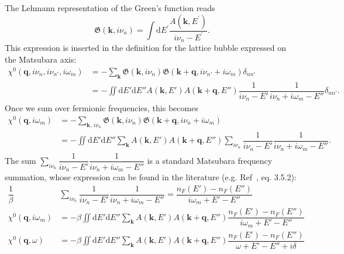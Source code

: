 \documentclass[preprint,prb,amsmath,superscriptaddress,showpacs]{revtex4}
\newcommand{\bk}{\mathbf{k}}
\newcommand{\bq}{\mathbf{q}}
\begin{document}
The Lehmann representation of the
Green's function reads
% 
\begin{equation}
  \mathfrak{G}(\mathbf{k}, i\nu_n) =
  \int \mathrm{d}E^{\prime}
  \frac{A(\mathbf{k}, E^{\prime})}{i\nu_n - E^{\prime}}.
\end{equation}
%
This expression is inserted in the definition for the lattice bubble
expressed on the Matsubara axis\cite{Boehnke2011, Kunes2011}:
%
\begin{equation}
  \begin{aligned}
      \chi^0(\bq, i\nu_n, i\nu_{n'}, i \omega_m) &=
      - \sum_{\bk}
      \mathfrak{G}(\bk, i\nu_n)
      \mathfrak{G}(\bk + \bq, i\nu_{n'} + i\omega_m) \delta_{n n'} \\
      &= - \iint
      \mathrm{d}E'
      \mathrm{d}E''
      A(\bk, E') 
      A(\bk + \bq, E'')
      \dfrac{1}{i\nu_n - E'}
      \dfrac{1}{i\nu_{n} + i \omega_m - E''}\delta_{n n'}.
    \end{aligned}
  \end{equation}
Once we sum over fermionic frequencies, this becomes 
%
\begin{equation}
  \begin{aligned}
    \chi^0(\bq, i \omega_m) &=
    - \sum_{\bk, \, i\nu_n}
    \mathfrak{G}(\bk, i\nu_n)
    \mathfrak{G}(\bk + \bq, i\nu_{n} + i\omega_m) \\
    &= - \iint
    \mathrm{d}E'
    \mathrm{d}E''
    \sum_{\bk} A(\bk, E') 
      A(\bk + \bq, E'')
      \sum_{i\nu_n}
    \dfrac{1}{i\nu_n - E'}
    \dfrac{1}{i\nu_{n} + i \omega_m - E''}.
    \end{aligned}
\end{equation}
%
The sum $\sum_{i\nu_n} \dfrac{1}{i\nu_n - E'} \dfrac{1}{i\nu_{n} + i
  \omega_m - E''}$ is a standard Matsubara frequency summation, whose
expression can be found in the literature (e.g. Ref~,
eq. 3.5.2):
\begin{equation}
  \begin{aligned}
    \label{eq:continuation}
    \dfrac{1}{\beta} &
    \sum_{i\nu_n}
    \dfrac{1}{i\nu_n - E'}
    \dfrac{1}{i\nu_{n} + i \omega_m - E''} =
    \dfrac{n_F(E') - n_F(E'')}
    {i\omega_m + E' - E''} \\
    \chi^0(\bq, i \omega_m)
    &= - \beta
    \iint
    \mathrm{d}E'
    \mathrm{d}E''
    \sum_{\bk} A(\bk, E') 
    A(\bk + \bq, E'')
    \dfrac{n_F(E') - n_F(E'')}
    {i\omega_m + E' - E''} \\
    \chi^0(\bq, \omega)
    &= - \beta
    \iint
    \mathrm{d}E'
    \mathrm{d}E''
    \sum_{\bk} A(\bk, E') 
    A(\bk + \bq, E'')
    \dfrac{n_F(E') - n_F(E'')}
    {\omega + E' - E'' + i\delta} \\
    \end{aligned}
\end{equation}
\end{document}
